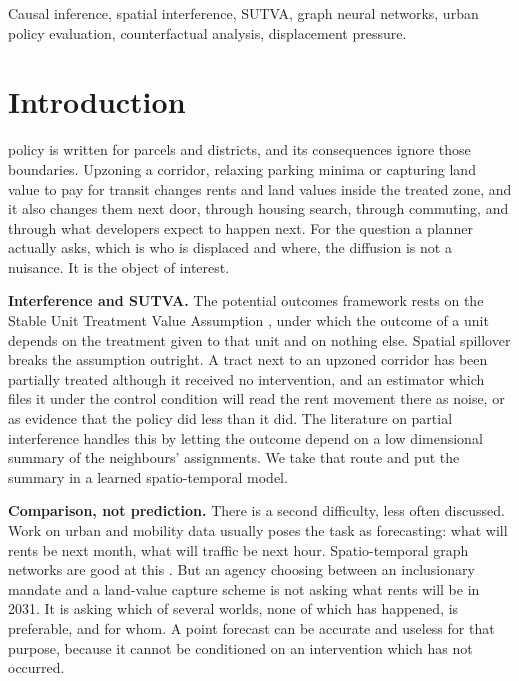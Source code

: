 \documentclass[journal]{IEEEtran}
\begin{document}
\begin{IEEEkeywords}
Causal inference, spatial interference, SUTVA, graph neural networks, urban
policy evaluation, counterfactual analysis, displacement pressure.
\end{IEEEkeywords}

\IEEEpeerreviewmaketitle

\section{Introduction}
\label{sec:intro}

 policy is written for parcels and districts, and its
consequences ignore those boundaries. Upzoning a corridor, relaxing parking
minima or capturing land value to pay for transit changes rents and land values
inside the treated zone, and it also changes them next door, through housing
search, through commuting, and through what developers expect to happen next.
For the question a planner actually asks, which is who is displaced and where,
the diffusion is not a nuisance. It is the object of interest.

\textbf{Interference and SUTVA.} The potential outcomes framework rests on the
Stable Unit Treatment Value Assumption \cite{rubin1980}, under which the outcome
of a unit depends on the treatment given to that unit and on nothing else.
Spatial spillover breaks the assumption outright. A tract next to an upzoned
corridor has been partially treated although it received no intervention, and an
estimator which files it under the control condition will read the rent movement
there as noise, or as evidence that the policy did less than it did. The
literature on partial interference \cite{hudgens2008,ogburn2014,forastiere2021}
handles this by letting the outcome depend on a low dimensional summary of the
neighbours' assignments. We take that route and put the summary in a learned
spatio-temporal model.

\textbf{Comparison, not prediction.} There is a second difficulty, less often
discussed. Work on urban and mobility data usually poses the task as
forecasting: what will rents be next month, what will traffic be next hour.
Spatio-temporal graph networks are good at this \cite{li2018dcrnn,yu2018stgcn}.
But an agency choosing between an inclusionary mandate and a land-value capture
scheme is not asking what rents will be in 2031. It is asking which of several
worlds, none of which has happened, is preferable, and for whom. A point
forecast can be accurate and useless for that purpose, because it cannot be
conditioned on an intervention which has not occurred.
\end{document}
